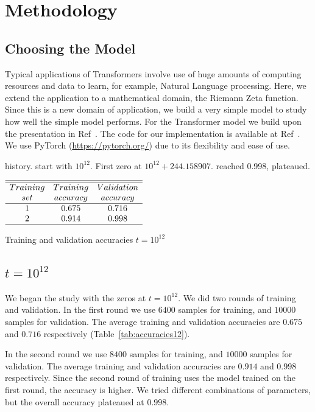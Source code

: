 \documentclass[journal]{IEEEtai}
\begin{document}
\section{Methodology}


\subsection{\label{sec3.1} Choosing the Model}
Typical applications of Transformers involve use of huge amounts of computing resources and data to learn, for example, Natural Language processing. Here, we extend the application to a mathematical domain, the Riemann Zeta function. Since this is a new domain of application, we build a very simple model to study how well the simple model performs. For the Transformer model we build upon the presentation in  Ref~\cite{BenjaminEtienne}. The code for our implementation is available at 
 Ref~\cite{shankergit}.
We use PyTorch (\url{https://pytorch.org/})  due to its flexibility and ease of use.


history. start with $10^{12}$. First zero   at $10^{12} + 244.158907$. reached 0.998, plateaued. 


\begin{table}
\centering \(\begin{array}{ccc}
\hline
\hline
Training  & Training &Validation  \\
set     &accuracy&accuracy\\
\hline
1  & 0.675 & 0.716 \\

2  & 0.914 & 0.998 \\
\hline
\end{array}\)
\caption{Training and validation accuracies $t=10^{12}$}
\label{tab:accuracies12}
\end{table}

\subsection{\label{10E12} $t=10^{12}$}

We began the study with the zeros at $t=10^{12}$.
We did two rounds of training and validation. In the first round we use $6400$ samples for training, and $10000$ samples for validation.   The average training and validation accuracies are $0.675$ and $0.716$ respectively (Table~\ref{tab:accuracies12}).

In the second round we use $8400$ samples for training, and $10000$ samples for validation. The average training and validation accuracies are $0.914$ and $0.998$ respectively. Since the second round of training uses the model trained on the first round, the accuracy is higher. We tried different combinations of parameters, but the overall accuracy plateaued at $0.998$.
\end{document}
